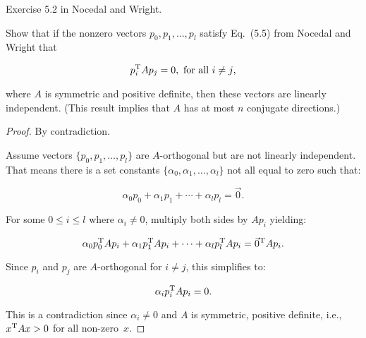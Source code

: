 \begin{problem}
  Exercise 5.2 in Nocedal and Wright.

  Show that if the nonzero vectors $p_0,p_1,\ldots,p_l$ satisfy Eq.~(5.5) from Nocedal and Wright that
  
  \[p_i^{\textnormal{T}} A p_{j} = 0, \textnormal{ for all } i \ne j\text{,}\]
  
  \noindent
  where $A$ is symmetric and positive definite, then these vectors are linearly independent. (This result implies that $A$ has at most $n$ conjugate directions.)
\end{problem}

\begin{proof} 
  By contradiction.  
  
  Assume vectors $\{p_0,p_1,\ldots,p_l\}$ are $A$-orthogonal but are not linearly independent.  That means there is a set constants $\{\alpha_0,\alpha_1,\ldots,\alpha_{l}\}$ not all equal to zero such that:
  
  \[ \alpha_{0}p_{0} + \alpha_{1}p_{1} + \cdots +\alpha_{l}p_{l} = \vec{0} \text{.}\]
  
  \noindent
  For some $0\leq i \leq l$ where $\alpha_i \ne 0$, multiply both sides by $Ap_i$ yielding:
  
  \[ \alpha_{0}p_{0}^{\textnormal{T}} Ap_{i} + \alpha_{1}p_{1}^{\textnormal{T}} Ap_{i} + \cdots +\alpha_{l}p_{l}^{\textnormal{T}} Ap_{i} = \vec{0}^{\textnormal{T}} Ap_{i} \text{.}\]
  
  \noindent
  Since $p_{i}$ and $p_{j}$ are $A$-orthogonal for ${i\ne j}$, this simplifies to:
  
  \[ \alpha_{i}p_{i}^{\textnormal{T}} Ap_{i} = 0 \text{.}\]
  
  \noindent 
  This is a contradiction since ${\alpha_i \ne 0}$ and $A$ is symmetric, positive definite, i.e.,~${x^{\textnormal{T}} A x > 0}$ for all non-zero~$x$.
\end{proof}
